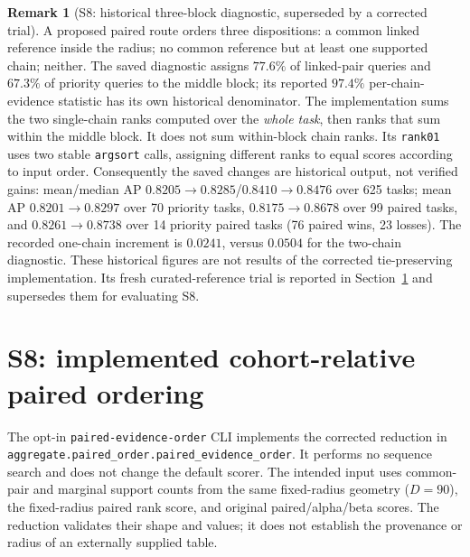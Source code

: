 \documentclass[10pt,a4paper]{article}
\theoremstyle{definition}
\newtheorem{remark}{Remark}
\newcommand{\code}[1]{\texttt{\small #1}}
\begin{document}
\begin{remark}[S8: historical three-block diagnostic, superseded by a corrected trial]\label{rem:threeblock}
A proposed paired route orders three dispositions: a common linked reference inside the radius;
no common reference but at least one supported chain; neither. The saved diagnostic assigns
$77.6\%$ of linked-pair queries and $67.3\%$ of priority queries to the middle block; its reported
$97.4\%$ per-chain-evidence statistic has its own historical denominator.
The implementation sums the two single-chain ranks computed over the \emph{whole task}, then
ranks that sum within the middle block. It does not sum within-block chain ranks.
Its \code{rank01} uses two stable \code{argsort} calls, assigning different ranks to equal scores
according to input order. Consequently the saved changes are historical output, not verified gains:
mean/median AP $0.8205\to0.8285$/$0.8410\to0.8476$ over 625 tasks;
mean AP $0.8201\to0.8297$ over 70 priority tasks, $0.8175\to0.8678$ over 99 paired tasks,
and $0.8261\to0.8738$ over 14 priority paired tasks (76 paired wins, 23 losses).
The recorded one-chain increment is $0.0241$, versus $0.0504$ for the two-chain diagnostic.
These historical figures are not results of the corrected tie-preserving implementation.
Its fresh curated-reference trial is reported in Section~\ref{sec:s8} and supersedes them for evaluating S8.
\end{remark}

\section{S8: implemented cohort-relative paired ordering}\label{sec:s8}
The opt-in \code{paired-evidence-order} CLI implements the corrected reduction in
\code{aggregate.paired\_order.paired\_evidence\_order}. It performs no sequence search and does
not change the default scorer. The intended input uses common-pair and marginal support counts
from the same fixed-radius geometry ($D=90$), the fixed-radius paired rank score, and original
paired/alpha/beta scores. The reduction validates their shape and values; it does not establish
the provenance or radius of an externally supplied table.
\end{document}
